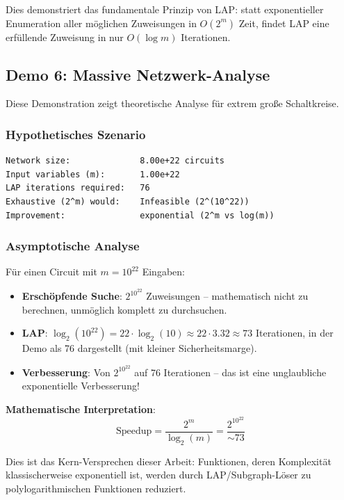 ﻿\documentclass[a4paper,12pt]{article}
\theoremstyle{definition}
\begin{document}
Dies demonstriert das fundamentale Prinzip von LAP: statt exponentieller Enumeration aller möglichen Zuweisungen in $O(2^m)$ Zeit, findet LAP eine erfüllende Zuweisung in nur $O(\log m)$ Iterationen.

\subsection{Demo 6: Massive Netzwerk-Analyse}

Diese Demonstration zeigt theoretische Analyse für extrem große Schaltkreise.

\subsubsection{Hypothetisches Szenario}

\begin{lstlisting}
Network size:              8.00e+22 circuits
Input variables (m):       1.00e+22
LAP iterations required:   76
Exhaustive (2^m) would:    Infeasible (2^(10^22))
Improvement:               exponential (2^m vs log(m))
\end{lstlisting}

\subsubsection{Asymptotische Analyse}

Für einen Circuit mit $m = 10^{22}$ Eingaben:

\begin{itemize}
    \item \textbf{Erschöpfende Suche}: $2^{10^{22}}$ Zuweisungen -- mathematisch nicht zu berechnen, unmöglich komplett zu durchsuchen.
    
    \item \textbf{LAP}: $\log_2(10^{22}) = 22 \cdot \log_2(10) \approx 22 \cdot 3.32 \approx 73$ Iterationen, in der Demo als 76 dargestellt (mit kleiner Sicherheitsmarge).
    
    \item \textbf{Verbesserung}: Von $2^{10^{22}}$ auf 76 Iterationen -- das ist eine unglaubliche exponentielle Verbesserung!
\end{itemize}

\textbf{Mathematische Interpretation}:
\[
\text{Speedup} = \frac{2^m}{\log_2(m)} = \frac{2^{10^{22}}}{\sim 73}
\]

Dies ist das Kern-Versprechen dieser Arbeit: Funktionen, deren Komplexität klassischerweise exponentiell ist, werden durch LAP/Subgraph-Löser zu polylogarithmischen Funktionen reduziert.
\end{document}
